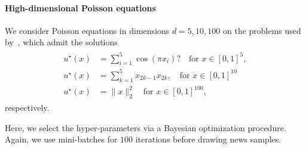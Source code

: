 \paragraph{High-dimensional Poisson equations}
We consider Poisson equations in dimensions $d=5,10,100$ on the problems used by~\cite{yu2018deep, muller2023achieving}, which admit the solutions 
\begin{align}\label{eq:solutions_poisson}
    \begin{split}
        u^\star(x) & = \sum_{i=1}^5 \cos(\pi x_i)? \quad \text{for } x\in [0,1]^{5}, \\
        u^\star(x) & = \sum_{k=1}^5 x_{2k-1}x_{2k},  \quad \text{for } x\in [0,1]^{10} \\ 
        u^\star(x) & = \lVert x \rVert_2^2 \quad \text{for } x\in [0,1]^{100}, 
    \end{split}
\end{align}
respectively. 

Here, we select the hyper-parameters via a Bayesian optimization procedure. 
Again, we use mini-batches for $100$ iterations before drawing news samples. 


